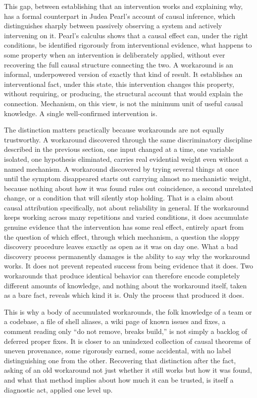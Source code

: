 \documentclass[11pt]{article}
\begin{document}
This gap, between establishing that an intervention works and explaining why, has a formal counterpart in Judea Pearl's account of causal inference, which distinguishes sharply between passively observing a system and actively intervening on it. Pearl's calculus shows that a causal effect can, under the right conditions, be identified rigorously from interventional evidence, what happens to some property when an intervention is deliberately applied, without ever recovering the full causal structure connecting the two. A workaround is an informal, underpowered version of exactly that kind of result. It establishes an interventional fact, under this state, this intervention changes this property, without requiring, or producing, the structural account that would explain the connection. Mechanism, on this view, is not the minimum unit of useful causal knowledge. A single well-confirmed intervention is.

The distinction matters practically because workarounds are not equally trustworthy. A workaround discovered through the same discriminatory discipline described in the previous section, one input changed at a time, one variable isolated, one hypothesis eliminated, carries real evidential weight even without a named mechanism. A workaround discovered by trying several things at once until the symptom disappeared starts out carrying almost no mechanistic weight, because nothing about how it was found rules out coincidence, a second unrelated change, or a condition that will silently stop holding. That is a claim about causal attribution specifically, not about reliability in general. If the workaround keeps working across many repetitions and varied conditions, it does accumulate genuine evidence that the intervention has some real effect, entirely apart from the question of which effect, through which mechanism, a question the sloppy discovery procedure leaves exactly as open as it was on day one. What a bad discovery process permanently damages is the ability to say why the workaround works. It does not prevent repeated success from being evidence that it does. Two workarounds that produce identical behavior can therefore encode completely different amounts of knowledge, and nothing about the workaround itself, taken as a bare fact, reveals which kind it is. Only the process that produced it does.

This is why a body of accumulated workarounds, the folk knowledge of a team or a codebase, a file of shell aliases, a wiki page of known issues and fixes, a comment reading only ``do not remove, breaks build,'' is not simply a backlog of deferred proper fixes. It is closer to an unindexed collection of causal theorems of uneven provenance, some rigorously earned, some accidental, with no label distinguishing one from the other. Recovering that distinction after the fact, asking of an old workaround not just whether it still works but how it was found, and what that method implies about how much it can be trusted, is itself a diagnostic act, applied one level up.
\end{document}
